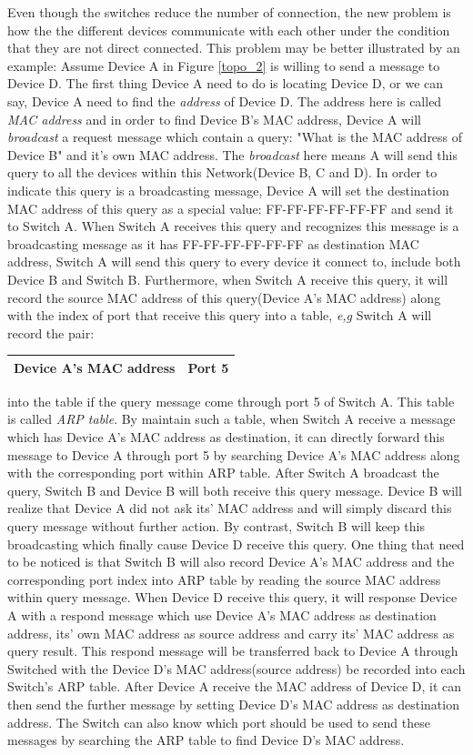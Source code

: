\documentclass[10pt,a4paper]{article}
\begin{document}
Even though the switches reduce the number of connection, the new problem is how the the different devices communicate with each other under the condition that they are not direct connected. This problem may be better illustrated by an example: Assume Device A in Figure \ref{topo_2} is willing to send a message to Device D. The first thing Device A need to do is locating Device D, or we can say, Device A need to find the \textit{address} of Device D. The address here is called \textit{MAC address} and in order to find Device B's MAC address, Device A will \textit{broadcast} a request message which contain a query: "What is the MAC address of Device B" and it's own MAC address. The \textit{broadcast} here means A will send this query to all the devices within this Network(Device B, C and D). In order to indicate this query is a broadcasting message, Device A will set the destination MAC address of this query as a special value: FF-FF-FF-FF-FF-FF and send it to Switch A. When Switch A receives this query and recognizes this message is a broadcasting message as it has FF-FF-FF-FF-FF-FF as destination MAC address, Switch A will send this query to every device it connect to, include both Device B and Switch B. Furthermore, when Switch A receive this query, it will record the source MAC address of this query(Device A's MAC address) along with the index of port that receive this query into a table, \textsl{e,g} Switch A will record the pair:
\begin{center}
	\begin{tabular}{|c|c|}
		\hline
		Device A's MAC address & Port 5 \\
		\hline
	\end{tabular}
\end{center}
into the table if the query message come through port 5 of Switch A. This table is called \textit{ARP table}. By maintain such a table, when Switch A receive a message which has Device A's MAC address as destination, it can directly forward this message to Device A through port 5 by searching Device A's MAC address along with the corresponding port within ARP table. After Switch A broadcast the query, Switch B and Device B will both receive this query message. Device B will realize that Device A did not ask its' MAC address and will simply discard this query message without further action. By contrast, Switch B will keep this broadcasting which finally cause Device D receive this query. One thing that need to be noticed is that Switch B will also record Device A's MAC address and the corresponding port index into ARP table by reading the source MAC address within query message. When Device D receive this query, it will response Device A with a respond message which use Device A's MAC address as destination address, its' own MAC address as source address and carry its' MAC address as query result. This respond message will be transferred back to Device A through Switched with the Device D's MAC address(source address) be recorded into each Switch's ARP table. After Device A receive the MAC address of Device D, it can then send the further message by setting Device D's MAC address as destination address. The Switch can also know which port should be used to send these messages by searching the ARP table to find Device D's MAC address. 
\end{document}
